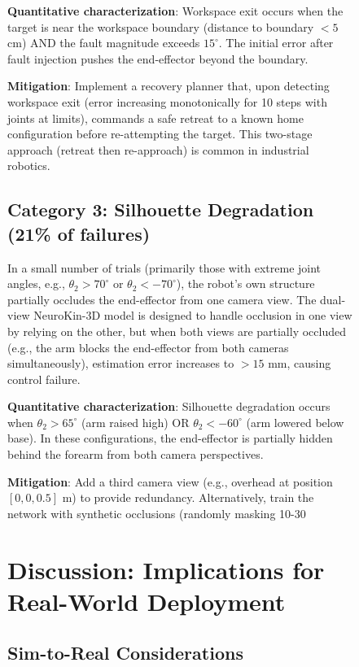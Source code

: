 \documentclass[12pt,a4paper,oneside]{report}
\begin{document}
\begin{figure}[H]
\textbf{Quantitative characterization}: Workspace exit occurs when the target is near the workspace boundary (distance to boundary $< 5$ cm) AND the fault magnitude exceeds $15^\circ$. The initial error after fault injection pushes the end-effector beyond the boundary.

\textbf{Mitigation}: Implement a recovery planner that, upon detecting workspace exit (error increasing monotonically for 10 steps with joints at limits), commands a safe retreat to a known home configuration before re-attempting the target. This two-stage approach (retreat then re-approach) is common in industrial robotics.

\subsection{Category 3: Silhouette Degradation (21\% of failures)}

In a small number of trials (primarily those with extreme joint angles, e.g., $\theta_2 > 70^\circ$ or $\theta_2 < -70^\circ$), the robot's own structure partially occludes the end-effector from one camera view. The dual-view NeuroKin-3D model is designed to handle occlusion in one view by relying on the other, but when both views are partially occluded (e.g., the arm blocks the end-effector from both cameras simultaneously), estimation error increases to $>15$ mm, causing control failure.

\textbf{Quantitative characterization}: Silhouette degradation occurs when $\theta_2 > 65^\circ$ (arm raised high) OR $\theta_2 < -60^\circ$ (arm lowered below base). In these configurations, the end-effector is partially hidden behind the forearm from both camera perspectives.

\textbf{Mitigation}: Add a third camera view (e.g., overhead at position $[0, 0, 0.5]$ m) to provide redundancy. Alternatively, train the network with synthetic occlusions (randomly masking 10-30%

\section{Discussion: Implications for Real-World Deployment}

\subsection{Sim-to-Real Considerations}


\end{figure}
\end{document}
